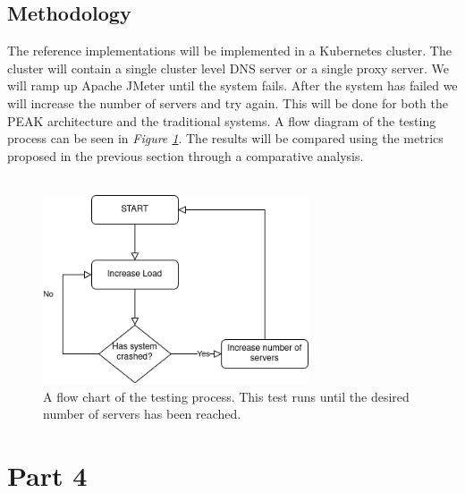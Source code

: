 \documentclass[12pt]{article}
\begin{document}
\subsection{Methodology}
The reference implementations will be implemented in a Kubernetes cluster.
The cluster will contain a single cluster level DNS server \cite{heimonenPreprintPEAKProxy2024} or a single proxy server.
We will ramp up Apache JMeter \cite{ApacheJMeterApache} until the system fails. 
After the system has failed we will increase the number of servers and try again.
This will be done for both the PEAK architecture and the traditional systems.
A flow diagram of the testing process can be seen in \textit{Figure \ref{fig:flow-chart}}.
The results will be compared using the metrics proposed in the previous section through a comparative analysis.
\\
\\
\begin{figure}[H]
    \centering
    \includegraphics[width=0.7\textwidth]{flow chart.drawio.png}
    \caption{A flow chart of the testing process. 
    This test runs until the desired number of servers has been reached.}
    \label{fig:flow-chart}
\end{figure}

\section{Part 4}
\end{document}
